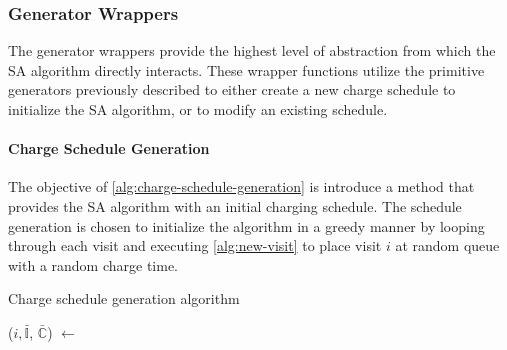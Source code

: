 \documentclass[energies,article,submit,moreauthors]{Definitions/mdpi}
\newcommand{\I}{\mathbb{I}}                 %
\newcommand{\C}{\mathbb{C}}                 %
\newcommand{\Sol}{\mathbb{S}}               %
\begin{document}
\subsubsection{Generator Wrappers}
\label{sec:sa-generator-wrappers}
The generator wrappers provide the highest level of abstraction from which the SA algorithm directly interacts. These
wrapper functions utilize the primitive generators previously described to either create a new charge schedule to
initialize the SA algorithm, or to modify an existing schedule.

\paragraph{Charge Schedule Generation}
\label{sec:sa-charge-schedule-generation}
The objective of \ref{alg:charge-schedule-generation} is introduce a method that provides the SA algorithm with an
initial charging schedule. The schedule generation is chosen to initialize the algorithm in a greedy manner by looping
through each visit and executing \ref{alg:new-visit} to place visit \(i\) at random queue with a random charge time.

\begin{algorithm}[H]
\scriptsize
\caption{Charge schedule generation algorithm} \label{alg:charge-schedule-generation}
    \LinesNumbered
    \KwIn{$\Sol$}
    \KwOut{$\bar{\Sol}$}


    \Begin
    {
        \ForEach {$\I_i \in \I$}
        {
            ($i, \bar{\I}$, $\bar{\C}$) $\leftarrow$ \NewVisit{($\I_i$, $\I$, $\C$)}
        }
            \Return{($0, \bar{\I}$, $\bar{\C}$)}
    }
  \end{algorithm}
\end{document}
